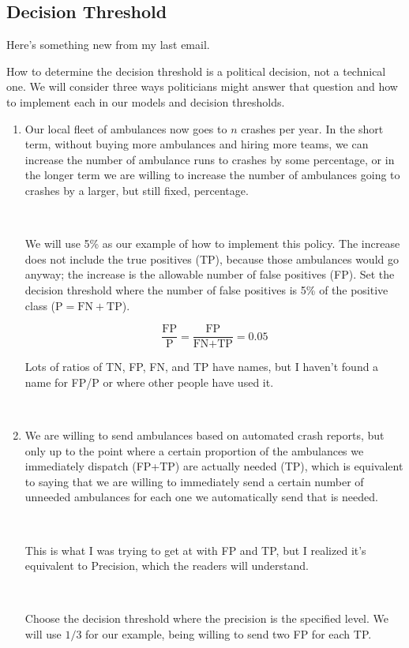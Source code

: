 \subsection{Decision Threshold}

Here's something new from my last email.  

How to determine the decision threshold is a political decision, not a technical one.  We will consider three ways politicians might answer that question and how to implement each in our models and decision thresholds.  

\begin{enumerate}
	\item Our local fleet of ambulances now goes to $n$ crashes per year.  In the short term, without buying more ambulances and hiring more teams, we can increase the number of ambulance runs to crashes by some percentage, or in the longer term we are willing to increase the number of ambulances going to crashes by a larger, but still fixed, percentage.  
	
	\
	
	We will use 5\% as our example of how to implement this policy.  The increase does not include the true positives (TP), because those ambulances would go anyway; the increase is the allowable number of false positives (FP).  Set the decision threshold where the number of false positives is 5\% of the positive class ($\text{P} = \text{FN} + \text{TP}$).   

$$\frac{\text{FP}}{\text{P}} =  \frac{\text{FP}}{\text{FN} + \text{TP}} = 0.05  $$

Lots of ratios of TN, FP, FN, and TP have names, but I haven't found a name for FP/P or where other people have used it.  

\

	
	\item We are willing to send ambulances based on automated crash reports, but only up to the point where a certain proportion of the ambulances we immediately dispatch (FP+TP) are actually needed (TP), which is equivalent to saying that we are willing to immediately send a certain number of unneeded ambulances for each one we automatically send that is needed.  
	
	\
	
	This is what I was trying to get at with FP and TP, but I realized it's equivalent to Precision, which the readers will understand.  
	
	\
	
	Choose the decision threshold where the precision is the specified level.  We will use $1/3$ for our example, being willing to send two FP for each TP.  
	

\end{enumerate}
